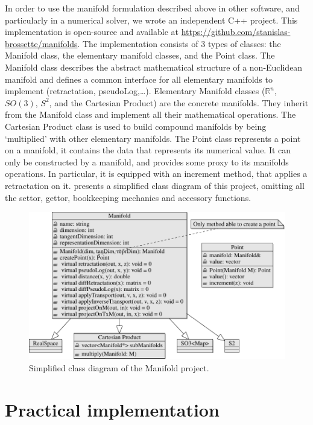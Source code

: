In order to use the manifold formulation described above in other software, and particularly in a numerical solver, we wrote an independent C++ project.
This implementation is open-source and available at \href{https://github.com/stanislas-brossette/manifolds}{https://github.com/stanislas-brossette/manifolds}.
The implementation consists of 3 types of classes: the Manifold class, the elementary manifold classes, and the Point class.
The Manifold class describes the abstract mathematical structure of a non-Euclidean manifold and defines a common interface for all elementary manifolds to implement (retractation, pseudoLog,\ldots).
Elementary Manifold classes ($\mathbb{R}^n$, $SO(3)$, $S^2$, and the Cartesian Product) are the concrete manifolds.
They inherit from the Manifold class and implement all their mathematical operations.
The Cartesian Product class is used to build compound manifolds by being `multiplied' with other elementary manifolds.
The Point class represents a point on a manifold, it contains the data that represents its numerical value.
It can only be constructed by a manifold, and provides some proxy to its manifolds operations.
In particular, it is equipped with an increment method, that applies a retractation on it.
 presents a simplified class diagram of this project, omitting all the settor, gettor, bookkeeping mechanics and accessory functions.

\begin{figure}[htpb]
  \centering
  \includegraphics[width=\linewidth]{uml/manifolds-1.pdf}
  \caption{Simplified class diagram of the Manifold project.}
\label{fig:uml_manifold}
\end{figure}

\section{Practical implementation}
\label{sec:practical_implementation}

